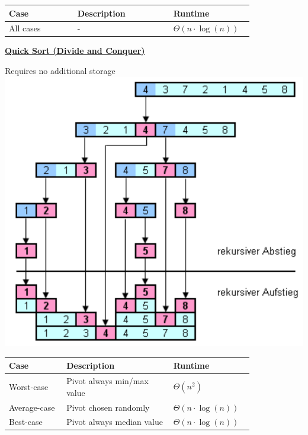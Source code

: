         

        \begin{tabular*}{\linewidth}{| p{0.25\linewidth} | p{0.35\linewidth} | p{0.22\linewidth} |}
            \hline
            Case & Description & Runtime\\
            \hline \hline
            All cases & - & $\Theta (n \cdot \log(n))$ \\
            \hline
        \end{tabular*}
    
    {\centering\underline{\textbf{Quick Sort (Divide and Conquer)}} \par}
        Requires no additional storage\\
        \includegraphics[width = \linewidth]{src/3_containers/images/quicksort.png}
          
        
        \begin{tabular*}{\linewidth}{| p{0.21\linewidth} | p{0.39\linewidth} | p{0.22\linewidth} |}
            \hline
            Case & Description & Runtime\\
            \hline \hline
            Worst-case & Pivot always min/max value & $\Theta(n^2)$ \\
            \hline
            Average-case & Pivot chosen randomly & $\Theta(n \cdot \log(n))$ \\
            \hline
            Best-case & Pivot always median value & $\Theta(n \cdot \log(n))$ \\
            \hline
        \end{tabular*}

